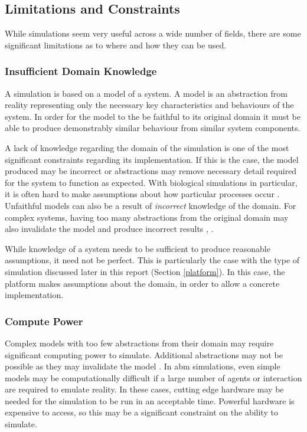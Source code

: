 \documentclass{UoYCSproject}
\begin{document}
\subsection{Limitations and Constraints}
While simulations seem very useful across a wide number of fields, there are some significant limitations as to where and how they can be used.

\subsubsection{Insufficient Domain Knowledge}
\label{domain_knowledge}
A simulation is based on a model of a system.
A model is an abstraction from reality representing only the necessary key characteristics and behaviours of the system.
In order for the model to the be faithful to its original domain it must be able to produce demonstrably similar behaviour from similar system components.

A lack of knowledge regarding the domain of the simulation is one of the most significant constraints regarding its implementation.
If this is the case, the model produced may be incorrect or abstractions may remove necessary detail required for the system to function as expected.
With biological simulations in particular, it is often hard to make assumptions about how particular processes occur \cite{stepney_abm}.
Unfaithful models can also be a result of \textit{incorrect} knowledge of the domain.
For complex systems, having too many abstractions from the original domain may also invalidate the model and produce incorrect results \cite[p.8]{cosmos}, \cite{stepney_abm}.

While knowledge of a system needs to be sufficient to produce reasonable assumptions, it need not be perfect.
This is particularly the case with the type of simulation discussed later in this report (Section \ref{platform}).
In this case, the \gls{platform} makes assumptions about the domain, in order to allow a concrete implementation.

\subsubsection{Compute Power}
Complex models with too few abstractions from their domain may require significant computing power to simulate.
Additional abstractions may not be possible as they may invalidate the model \cite{stepney_abm}.
In \gls{abm} simulations, even simple models may be computationally difficult if a large number of agents or interaction are required to emulate reality.
In these cases, cutting edge hardware may be needed for the simulation to be run in an acceptable time.
Powerful hardware is expensive to access, so this may be a significant constraint on the ability to simulate.
\end{document}
